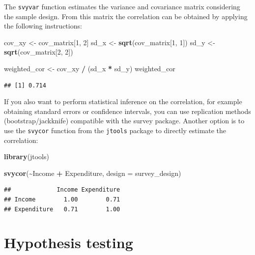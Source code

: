 \documentclass[
  english,
  12pt,
]{book}
\newenvironment{Shaded}{\begin{snugshade}}{\end{snugshade}}
\newcommand{\AttributeTok}[1]{\textcolor[rgb]{0.13,0.29,0.53}{#1}}
\newcommand{\DecValTok}[1]{\textcolor[rgb]{0.00,0.00,0.81}{#1}}
\newcommand{\FunctionTok}[1]{\textcolor[rgb]{0.13,0.29,0.53}{\textbf{#1}}}
\newcommand{\NormalTok}[1]{#1}
\newcommand{\OtherTok}[1]{\textcolor[rgb]{0.56,0.35,0.01}{#1}}
\newcommand{\SpecialCharTok}[1]{\textcolor[rgb]{0.81,0.36,0.00}{\textbf{#1}}}
\begin{document}
The \texttt{svyvar} function estimates the variance and covariance matrix considering the sample design. From this matrix the correlation can be obtained by applying the following instructions:

\begin{Shaded}
\begin{Highlighting}[]
\NormalTok{cov\_xy }\OtherTok{\textless{}{-}}\NormalTok{ cov\_matrix[}\DecValTok{1}\NormalTok{, }\DecValTok{2}\NormalTok{]}
\NormalTok{sd\_x }\OtherTok{\textless{}{-}} \FunctionTok{sqrt}\NormalTok{(cov\_matrix[}\DecValTok{1}\NormalTok{, }\DecValTok{1}\NormalTok{])}
\NormalTok{sd\_y }\OtherTok{\textless{}{-}} \FunctionTok{sqrt}\NormalTok{(cov\_matrix[}\DecValTok{2}\NormalTok{, }\DecValTok{2}\NormalTok{])}

\NormalTok{weighted\_cor }\OtherTok{\textless{}{-}}\NormalTok{ cov\_xy }\SpecialCharTok{/}\NormalTok{ (sd\_x }\SpecialCharTok{*}\NormalTok{ sd\_y)}
\NormalTok{weighted\_cor}
\end{Highlighting}
\end{Shaded}

\begin{verbatim}
## [1] 0.714
\end{verbatim}

If you also want to perform statistical inference on the correlation, for example obtaining standard errors or confidence intervals, you can use replication methods (bootstrap/jackknife) compatible with the survey package. Another option is to use the \texttt{svycor} function from the \texttt{jtools} package to directly estimate the correlation:

\begin{Shaded}
\begin{Highlighting}[]
\FunctionTok{library}\NormalTok{(jtools)}

\FunctionTok{svycor}\NormalTok{(}\SpecialCharTok{\textasciitilde{}}\NormalTok{Income }\SpecialCharTok{+}\NormalTok{ Expenditure, }\AttributeTok{design =}\NormalTok{ survey\_design)}
\end{Highlighting}
\end{Shaded}

\begin{verbatim}
##             Income Expenditure
## Income        1.00        0.71
## Expenditure   0.71        1.00
\end{verbatim}

\section{Hypothesis testing}\label{pruebas-de-hipotesis}
\end{document}
